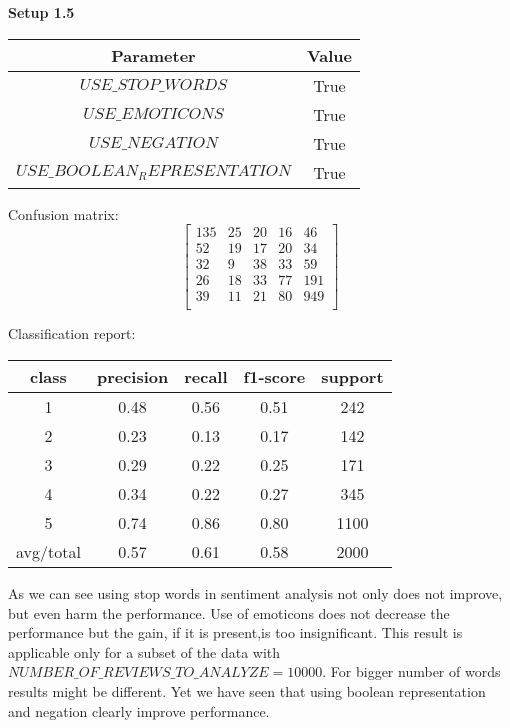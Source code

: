 \documentclass[12pt]{report}
\begin{document}
\textbf{Setup 1.5}

\begin{center}
	\begin{tabular}{ c | c }
		\hline
		Parameter & Value \\ \hline
		$USE\_STOP\_WORDS$ & True \\ \hline
		$USE\_EMOTICONS$ & True \\ \hline
		$USE\_NEGATION$ & True \\ \hline
		$USE\_BOOLEAN_REPRESENTATION$ & True \\ \hline
	\end{tabular}
\end{center}

Confusion matrix:
\[
\begin{bmatrix}
135 & 25 & 20 & 16 & 46 \\
52 & 19 & 17 & 20 & 34 \\
32 &  9 & 38 & 33 & 59 \\
26 & 18 & 33 & 77 & 191 \\
39 & 11 & 21 & 80 & 949 \\
\end{bmatrix}
\]

Classification report:

\begin{center}
	\begin{tabular}{c | c | c | c | c }
		\hline
		class & precision & recall & f1-score & support \\ \hline
		1 & 0.48 & 0.56 & 0.51 & 242 \\ \hline
		2 & 0.23 & 0.13 & 0.17 & 142 \\ \hline
		3 & 0.29 & 0.22 & 0.25 & 171 \\ \hline
		4 & 0.34 & 0.22 & 0.27 & 345 \\ \hline
		5 & 0.74 & 0.86 & 0.80 & 1100 \\ \hline
		avg/total & 0.57 & 0.61 & 0.58 & 2000 \\ \hline
	\end{tabular}
\end{center}

As we can see using stop words in sentiment analysis not only does not improve, but even harm the performance. Use of emoticons does not decrease the performance but the gain, if it is present,is too insignificant.
This result is applicable only for a subset of the data with $NUMBER\_OF\_REVIEWS\_TO\_ANALYZE = 10000$. For bigger number of words results might be different. Yet we have seen that using boolean representation and negation clearly improve performance.
\end{document}
